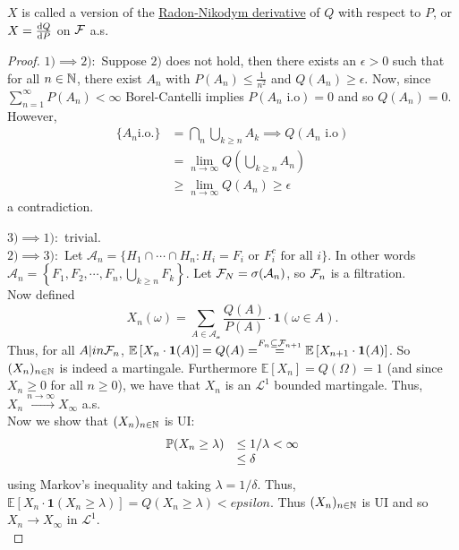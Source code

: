 \documentclass{article}
\begin{document}
\begin{remark}
$ X$ is called a version of the \underline{Radon-Nikodym derivative} of $ Q$ with respect to $ P$, or $ X = \frac{\operatorname{d}\!  Q}{\operatorname{d}\!  P}$ on $ \mathcal{F} $ a.s.
\end{remark}


\begin{proof}
	\underline{$ 1)\implies 2):$} Suppose $ 2)$ does not hold, then there exists an $ \epsilon>0$ such that for all $n\in \mathbb{N}$, there exist $ A_{n}$ with $ P(A_{n})\leq \frac{1}{n^{2}}$ and $ Q(A_{n})\geq \epsilon$. Now, since $\displaystyle\sum^{\infty}_{n=1}P(A_{n})<\infty$ Borel-Cantelli implies $ P(A_{n}\text{ i.o})=0 $ and so $ Q(A_{n}) = 0$. However, 
	\[
	\begin{array}{ll}
	\{A_{n} \text{i.o.} \} &= \bigcap_{n} \bigcup_{k\geq n} A_{k} \implies Q(A_{n}\text{ i.o})  \\
	     &= \lim_{n \to \infty} Q \left( \bigcup_{k\geq n } A_{n}\right)\\ 
	     &\geq  \lim_{n \to \infty} Q(A_{n})\geq \epsilon \,
	\end{array}
	\]
a contradiction.	

\underline{$ 3) \implies 1):$} trivial. \\ 

\underline{$ 2) \implies 3):$} Let $ \mathcal{A}_{n} = \{H_{1}\cap \cdots\cap H_{n}:H_{i} = F_{i} \text{ or } F_{i}^{c} \text{ for all } i \}$. In other words $ \mathcal{A}_{n} = \left\{F_{1}, F_{2}, \cdots, F_{n}, \bigcup_{k\geq n} F_{k}\right\}$. Let $ \mathcal{F}_{N} = \sigma (\mathcal{A}_{n})$, so $ \mathcal{F}_{n}$ is a filtration.\\ 

Now defined
\[
X_{n}(\omega) =\displaystyle\sum_{A\in \mathcal{A_{n}}}\frac{Q(A)}{P(A)} \cdot \mathbf{1}(\omega \in A). 
\]
Thus, for all $ A|in \mathcal{F}_{n}$, $ \mathbb{E}\left[ X_{n}\cdot \mathbf{1}(A) \right] = Q(A) = \stackrel{F_{n}\subseteq\mathcal{F}_{n+1}}{=} \mathbb{E}\left[ X_{n+1}\cdot \mathbf{1}(A) \right]
$. So $ (X_{n})_{n\in \mathbb{N}}$ is indeed a martingale. Furthermore $ \mathbb{E}\left[ X_{n} \right] = Q(\Omega)=1$ (and since $ X_{n}\geq 0$ for all $ n\geq 0$), we have that $ X_{n}$ is an $ \mathcal{L}^{1 }$ bounded martingale. Thus, $ X_{n}\stackrel{n\to \infty}{\longrightarrow}X_{\infty}$ a.s.\\ 

Now we show that $ (X_{n})_{n\in \mathbb{N}}$ is UI: 
\[
\begin{array}{ll}
	\mathbb{P}(X_{n}\geq \lambda)&\leq 1/\lambda<\infty \\
     &\leq \delta
\end{array}
\]
using Markov's inequality and taking $ \lambda = 1/\delta$. Thus, $ \mathbb{E}\left[ X_{n}\cdot \mathbf{1}(X_{n}\geq \lambda) \right] = Q(X_{n}\geq \lambda)<
epsilon$. Thus $ (X_{n})_{n\in \mathbb{N}}$ is UI and so $ X_{n}\to X_{\infty}$ in $ \mathcal{L}^{1} $.\\ 


\end{proof}
\end{document}
